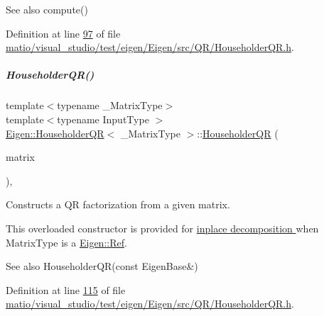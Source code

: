 \begin{DoxySeeAlso}{See also}
compute() 
\end{DoxySeeAlso}


Definition at line \hyperlink{matio_2visual__studio_2test_2eigen_2_eigen_2src_2_q_r_2_householder_q_r_8h_source_l00097}{97} of file \hyperlink{matio_2visual__studio_2test_2eigen_2_eigen_2src_2_q_r_2_householder_q_r_8h_source}{matio/visual\+\_\+studio/test/eigen/\+Eigen/src/\+Q\+R/\+Householder\+Q\+R.\+h}.

\mbox{\label{group___q_r___module_a95a53f8479ee147d7b0ccab71c13e45d}} 
\subparagraph{\texorpdfstring{Householder\+Q\+R()}{HouseholderQR()}\hspace{0.1cm}{\footnotesize\ttfamily [8/8]}}
{\footnotesize\ttfamily template$<$typename \+\_\+\+Matrix\+Type$>$ \\
template$<$typename Input\+Type $>$ \\
\hyperlink{group___q_r___module_class_eigen_1_1_householder_q_r}{Eigen\+::\+Householder\+QR}$<$ \+\_\+\+Matrix\+Type $>$\+::\hyperlink{group___q_r___module_class_eigen_1_1_householder_q_r}{Householder\+QR} (\begin{DoxyParamCaption}\item[{\hyperlink{group___core___module_struct_eigen_1_1_eigen_base}{Eigen\+Base}$<$ Input\+Type $>$ \&}]{matrix }\end{DoxyParamCaption})\hspace{0.3cm}{\ttfamily [inline]}, {\ttfamily [explicit]}}



Constructs a QR factorization from a given matrix. 

This overloaded constructor is provided for \hyperlink{group___inplace_decomposition}{inplace decomposition } when {\ttfamily Matrix\+Type} is a \hyperlink{group___core___module_class_eigen_1_1_ref}{Eigen\+::\+Ref}.

\begin{DoxySeeAlso}{See also}
Householder\+Q\+R(const Eigen\+Base\&) 
\end{DoxySeeAlso}


Definition at line \hyperlink{matio_2visual__studio_2test_2eigen_2_eigen_2src_2_q_r_2_householder_q_r_8h_source_l00115}{115} of file \hyperlink{matio_2visual__studio_2test_2eigen_2_eigen_2src_2_q_r_2_householder_q_r_8h_source}{matio/visual\+\_\+studio/test/eigen/\+Eigen/src/\+Q\+R/\+Householder\+Q\+R.\+h}.




